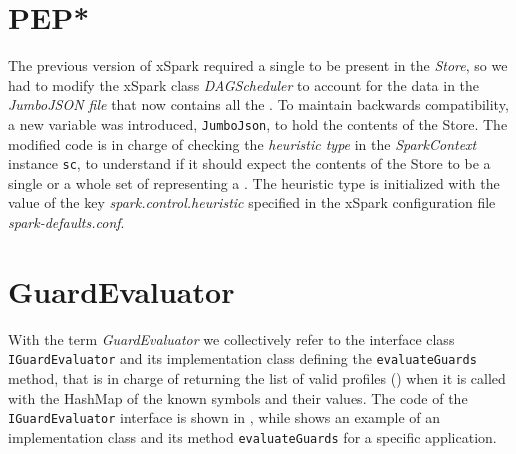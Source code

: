 \section{PEP*}\label{sec:getting_peps}
The previous version of xSpark required a single \plan to be present in the \textit{\plan Store}, so we had to modify the xSpark class \textit{DAGScheduler} to  account for the data in the \textit{JumboJSON file} that now contains all the \plans. To maintain backwards compatibility, a new variable was introduced, \texttt{JumboJson}, to hold the contents of the \model Store. The modified code is in charge of checking the \textit{heuristic type} in the \textit{SparkContext} instance \texttt{sc}, to understand if it should expect the contents of the \model Store to be a single \plan or a whole set of \plans representing a \model. The heuristic type is initialized with the value of the key \textit{spark.control.heuristic} specified in the xSpark configuration file \textit{spark-defaults.conf}. 



\section{GuardEvaluator}\label{sec:guard_evaluator}
With the term \textit{GuardEvaluator} we collectively refer to the interface class \texttt{IGuardEvaluator} and its implementation class defining the \texttt{evaluateGuards} method, that is in charge of returning the list of valid profiles (\plans) when it is called with the HashMap of the known symbols and their values. The code of the  \texttt{IGuardEvaluator} interface is shown in , while  shows an example of an implementation class and its method \texttt{evaluateGuards} for a specific application.




